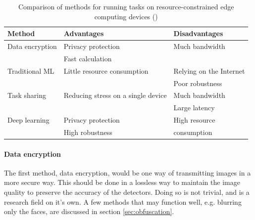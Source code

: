\begin{table}[H]
    \centering
    \renewcommand{\arraystretch}{1.5} %
    \setlength{\tabcolsep}{1em}
    \begin{tabular}{|l|l|l|}
        \hline
        \rowcolor{gray!25}
        \textbf{Method} & \textbf{Advantages}                & \textbf{Disadvantages}  \\ \hline
        Data encryption & Privacy protection                 & Much bandwidth          \\
                        & Fast calculation                   &                         \\ \hline
        Traditional ML  & Little resource consumption        & Relying on the Internet \\
                        &                                    & Poor robustness         \\ \hline
        Task sharing    & Reducing stress on a single device & Much bandwidth          \\
                        &                                    & Large latency           \\ \hline
        Deep learning   & Privacy protection                 & High resource           \\
                        & High robustness                    & consumption             \\ \hline
    \end{tabular}
    \caption{\centering Comparison of methods for running tasks on resource-constrained
        edge computing devices (\cite{hu2022accurateobjectdetectionatedge})}
    \label{tab:methods_to_run_tasks}
\end{table}

\paragraph{Data encryption}
The first method, data encryption, would be one way of transmitting images in a more secure way. This should be done in a lossless way to maintain the image quality to preserve the accuracy of the detectors. Doing so is not trivial, and is a research field on it's own. A few methods that may function well, e.g. blurring only the faces, are discussed in section \ref{sec:obfuscation}.


